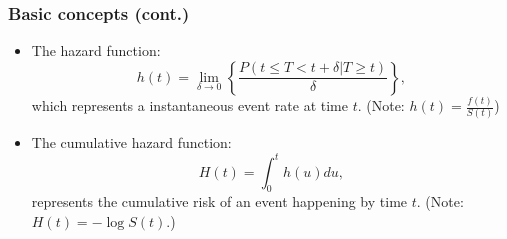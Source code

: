 \documentclass{beamer}
\begin{document}
	\begin{frame}
		\frametitle{Basic concepts (cont.)}
		\begin{itemize}
			\item The hazard function: 
			\[ h(t) = \lim_{  \delta \rightarrow 0 }\left\{ \frac{ P( t \leq T < t + \delta | T \geq t ) }{ \delta } \right\}, \]
			which represents a instantaneous event rate at time $t$. 
			(Note: $ h( t ) = \frac{ f( t ) }{ S( t ) }$)
			\item The cumulative hazard function:
			\[ H( t ) = \int_{ 0 }^{ t } h( u ) du, \]
			represents the cumulative risk of an event happening by time $t$.
			(Note: $H( t ) = - \log S( t )$.) 
		\end{itemize}
	\end{frame}

	\begin{frame}[allowframebreaks]
		\begin{singlespace}
			
			
		\end{singlespace}
	\end{frame}
\end{document}
